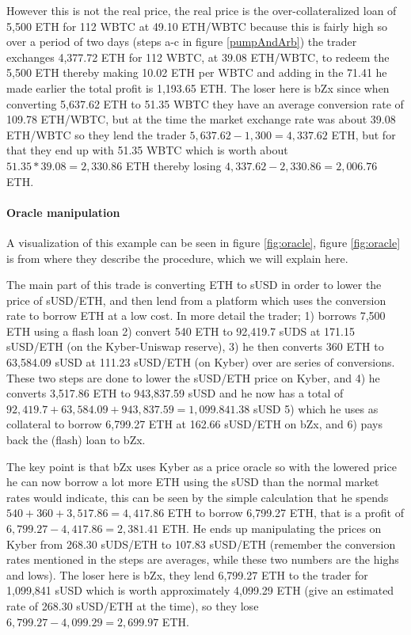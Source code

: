 However this is not the real price, the real price is the
over-collateralized loan of 5,500 ETH for 112 WBTC at 49.10 ETH/WBTC
because this is fairly high so over a period of two days (steps a-c in
figure \ref{pumpAndArb}) the trader exchanges 4,377.72 ETH for 112
WBTC, at 39.08 ETH/WBTC, to redeem the 5,500 ETH thereby making 10.02
ETH per WBTC and adding in the 71.41 he made earlier the total profit
is 1,193.65 ETH. The loser here is bZx since when converting 5,637.62
ETH to 51.35 WBTC they have an average conversion rate of 109.78
ETH/WBTC, but at the time the market exchange rate was about 39.08
ETH/WBTC so they lend the trader $5,637.62-1,300=4,337.62$ ETH, but
for that they end up with 51.35 WBTC which is worth about
$51.35*39.08=2,330.86$ ETH thereby losing $4,337.62-2,330.86=2,006.76$
ETH.

\paragraph{Oracle manipulation} A visualization of this example can be
seen in figure \ref{fig:oracle}, figure \ref{fig:oracle} is from
\cite{attack} where they describe the procedure, which we will explain
here.

The main part of this trade is converting ETH to sUSD in order to
lower the price of sUSD/ETH, and then lend from a platform which uses
the conversion rate to borrow ETH at a low cost. In more detail the
trader; 1) borrows 7,500 ETH using a flash loan 2) convert 540 ETH to
92,419.7 sUDS at 171.15 sUSD/ETH (on the Kyber-Uniswap reserve), 3) he
then converts 360 ETH to 63,584.09 sUSD at 111.23 sUSD/ETH (on Kyber)
over are series of conversions. These two steps are done to
lower the sUSD/ETH price on Kyber, and 4) he converts 3,517.86 ETH to
943,837.59 sUSD and he now has a total of
$92,419.7+63,584.09+943,837.59=1,099.841.38$ sUSD 5) which he uses as
collateral to borrow 6,799.27 ETH at 162.66 sUSD/ETH on bZx, and 6)
pays back the (flash) loan to bZx.

The key point is that bZx uses Kyber as a price oracle so with the
lowered price he can now borrow a lot more ETH using the sUSD than the
normal market rates would indicate, this can be seen by the simple
calculation that he spends $540+360+3,517.86=4,417.86$ ETH to borrow
6,799.27 ETH, that is a profit of $6,799.27-4,417.86=2,381.41$ ETH. He
ends up manipulating the prices on Kyber from 268.30 sUDS/ETH to
107.83 sUSD/ETH (remember the conversion rates mentioned in the steps
are averages, while these two numbers are the highs and lows). The
loser here is bZx, they lend 6,799.27 ETH to the trader for 1,099,841
sUSD which is worth approximately 4,099.29 ETH (give an estimated rate
of 268.30 sUSD/ETH at the time), so they lose
$6,799.27-4,099.29=2,699.97$ ETH.
